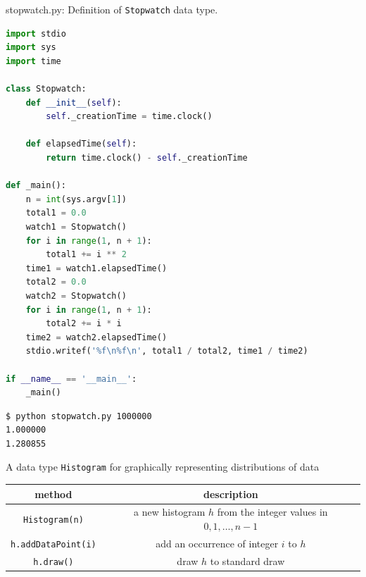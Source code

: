 \documentclass[8pt,a4paper,compress]{beamer}
\begin{document}
\begin{frame}[fragile]
\pause

\begin{framed}
\tiny stopwatch.py: Definition of \lstinline{Stopwatch} data type. 
\end{framed}

\begin{lstlisting}[language=Python]
import stdio
import sys
import time

class Stopwatch:
    def __init__(self):
        self._creationTime = time.clock()
    
    def elapsedTime(self):
        return time.clock() - self._creationTime

def _main():
    n = int(sys.argv[1])
    total1 = 0.0
    watch1 = Stopwatch()
    for i in range(1, n + 1):
        total1 += i ** 2
    time1 = watch1.elapsedTime()    
    total2 = 0.0
    watch2 = Stopwatch()
    for i in range(1, n + 1):
        total2 += i * i
    time2 = watch2.elapsedTime()    
    stdio.writef('%f\n%f\n', total1 / total2, time1 / time2)

if __name__ == '__main__':
    _main()
\end{lstlisting}

\pause

\begin{lstlisting}[language={}]
$ python stopwatch.py 1000000
1.000000
1.280855
\end{lstlisting}
\end{frame}

\begin{frame}[fragile]
\pause

A data type \lstinline{Histogram} for graphically representing distributions of data
\begin{center}
\begin{tabular}{cc}
method & description \\ \hline
\lstinline$Histogram(n)$ & a new histogram $h$ from the integer values in $0, 1, \dots, n-1$ \\
\lstinline$h.addDataPoint(i)$ & add an occurrence of integer $i$ to $h$ \\
\lstinline$h.draw()$ & draw $h$ to standard draw
\end{tabular} 
\end{center}
\end{frame}
\end{document}
